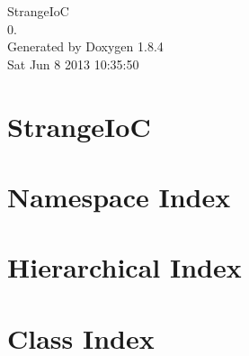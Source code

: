 \documentclass[twoside]{book}
\newcommand{\clearemptydoublepage}{%
  \newpage{\pagestyle{empty}\cleardoublepage}%
}
\begin{document}
\hypersetup{pageanchor=false}
\begin{titlepage}
\vspace*{7cm}
\begin{center}%
{\Large Strange\-Io\-C \\[1ex]\large 0. }\\
\vspace*{1cm}
{\large Generated by Doxygen 1.8.4}\\
\vspace*{0.5cm}
{\small Sat Jun 8 2013 10:35:50}\\
\end{center}
\end{titlepage}
\clearemptydoublepage
\tableofcontents
\clearemptydoublepage
{}
\hypersetup{pageanchor=true}

\chapter{Strange\-Io\-C}
\label{index}\hypertarget{index}{}
\chapter{Namespace Index}

\chapter{Hierarchical Index}

\chapter{Class Index}

\end{document}
